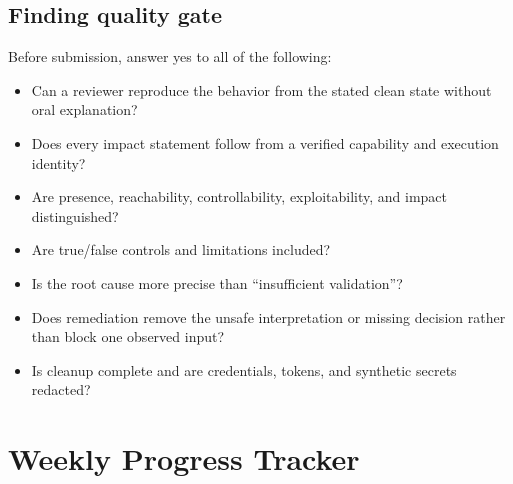 \documentclass[11pt]{article}
\begin{document}
\subsection{Finding quality gate}
Before submission, answer yes to all of the following:
\begin{itemize}
  \item Can a reviewer reproduce the behavior from the stated clean state without oral explanation?
  \item Does every impact statement follow from a verified capability and execution identity?
  \item Are presence, reachability, controllability, exploitability, and impact distinguished?
  \item Are true/false controls and limitations included?
  \item Is the root cause more precise than ``insufficient validation''?
  \item Does remediation remove the unsafe interpretation or missing decision rather than block one observed input?
  \item Is cleanup complete and are credentials, tokens, and synthetic secrets redacted?
\end{itemize}

\clearpage
\appendix
\section{Weekly Progress Tracker}
\end{document}
